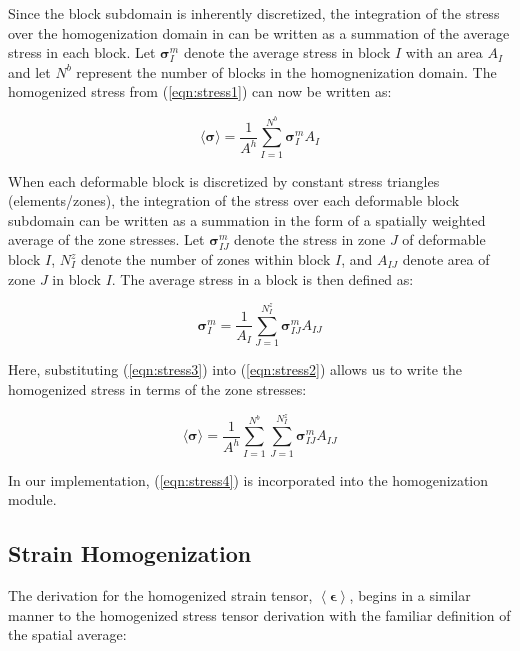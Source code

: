 Since the block subdomain is inherently discretized, the integration of the stress over the homogenization domain in can be written as a summation of the average stress in each block. Let $\boldsymbol{\sigma}_{I}^{m}$ denote the average stress in block $I$ with an area $A_{I}$ and let $N^{b}$ represent the number of blocks in the homognenization domain. The homogenized stress from (\ref{eqn:stress1}) can now be written as:

\begin{equation}
\langle\boldsymbol{\sigma}\rangle=\frac{1}{A^{h}}\sum_{I=1}^{N^{b}}\boldsymbol{\sigma}_{I}^{m}A_{I}\label{eqn:stress2}
\end{equation}

When each deformable block is discretized by constant stress triangles (elements/zones), the integration of the stress over each deformable block subdomain can be written as a summation in the form of a spatially weighted average of the zone stresses. Let $\boldsymbol{\sigma}_{IJ}^{m}$ denote the stress in zone $J$ of deformable block $I$, $N_{I}^{z}$ denote the number of zones within block $I$, and $A_{IJ}$ denote area of zone $J$ in block $I$. The average stress in a block is then defined as:

\begin{equation}
\boldsymbol{\sigma}_{I}^{m}=\frac{1}{A_{I}}\sum_{J=1}^{N_{I}^{z}}\boldsymbol{\sigma}_{IJ}^{m}A_{IJ}\label{eqn:stress3}
\end{equation}

Here, substituting (\ref{eqn:stress3}) into (\ref{eqn:stress2}) allows us to write the homogenized stress in terms of the zone stresses:

\begin{equation}
\langle\boldsymbol{\sigma}\rangle=\frac{1}{A^{h}}\sum_{I=1}^{N^{b}}\sum_{J=1}^{N_{I}^{z}}\boldsymbol{\sigma}_{IJ}^{m}A_{IJ}\label{eqn:stress4}
\end{equation}

In our implementation, (\ref{eqn:stress4}) is incorporated into the homogenization module.

\subsection{Strain Homogenization}

The derivation for the homogenized strain tensor, $\left< \boldsymbol{\epsilon}\right>$, begins in a similar manner to the homogenized stress tensor derivation with the familiar definition of the spatial average:

